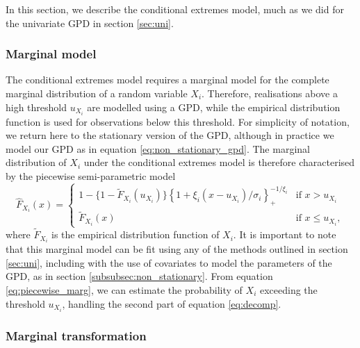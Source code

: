 \documentclass{article}
\numberwithin{equation}{section}
\begin{document}
In this section, we describe the conditional extremes model, much as we did for the univariate GPD in section \ref{sec:uni}.

\subsubsection{Marginal model}

The conditional extremes model requires a marginal model for the complete marginal distribution of a random variable $X_i$.
Therefore, realisations above a high threshold $u_{X_i}$ are modelled using a GPD, while the empirical distribution function is used for observations below this threshold.
For simplicity of notation, we return here to the stationary version of the GPD, although in practice we model our GPD as in equation \eqref{eq:non_stationary_gpd}.
The marginal distribution of $X_i$ under the conditional extremes model is therefore characterised by the piecewise semi-parametric model
\begin{equation} \label{eq:piecewise_marg}
  \hat{F}_{X_i}(x) = \begin{cases}
    1 - \{ 1 - \tilde{F}_{X_i}(u_{X_i})\} \left\{1 + \xi_{i}(x - u_{X_i})/\sigma_i\right\}_{+}^{-1/\xi_{i}} & \text{if } x > u_{X_i} \\
    \tilde{F}_{X_i}(x) & \text{if } x \le u_{X_i},
  \end{cases}
\end{equation}
where $\tilde{F}_{X_i}$ is the empirical distribution function of $X_i$.
It is important to note that this marginal model can be fit using any of the methods outlined in section \ref{sec:uni}, including with the use of covariates to model the parameters of the GPD, as in section \ref{subsubsec:non_stationary}.
From equation \ref{eq:piecewise_marg}, we can estimate the probability of $X_i$ exceeding the threshold $u_{X_i}$, handling the second part of equation \eqref{eq:decomp}. 

\subsubsection{Marginal transformation}
\end{document}
